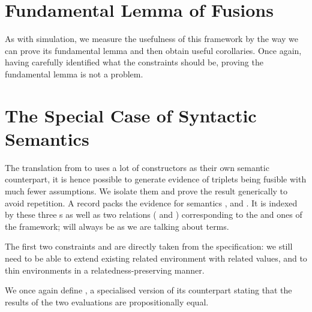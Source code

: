 
\section{Fundamental Lemma of Fusions}

As with simulation, we measure the usefulness of this framework by the way we can
prove its fundamental lemma and then obtain useful corollaries. Once again,
having carefully identified what the constraints should be, proving the fundamental
lemma is not a problem.


\section{The Special Case of Syntactic Semantics}

The translation from  to  uses a lot of constructors
as their own semantic counterpart, it is hence possible to generate evidence of
 triplets being fusible with much fewer assumptions. We isolate
them and prove the result generically to avoid repetition. A 
record packs the evidence for  semantics ,  and
. It is indexed by these three s as well as two relations
( and ) corresponding to the  and  ones of the
 framework;  will always be  as we are talking about terms.


The first two constraints  and  are directly taken
from the  specification: we still need to be able to extend existing related
environment with related values, and to thin environments in a relatedness-preserving manner.


We once again define , a specialised version of its  counterpart
stating that the results of the two evaluations are propositionally equal.


